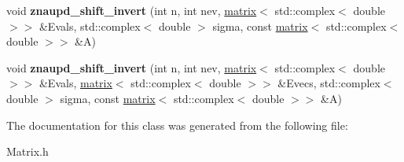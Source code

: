 \begin{DoxyCompactItemize}
\item 
\hypertarget{classkeycpp_1_1matrix_3_01_t_00_01dim_00_01_d_e_n_s_e___m_a_t_r_i_x_01_4_a30b43bbd651630fd1322b20ab9504ec8}{void {\bfseries znaupd\-\_\-shift\-\_\-invert} (int n, int nev, \hyperlink{classkeycpp_1_1matrix}{matrix}$<$ std\-::complex$<$ double $>$$>$ \&Evals, std\-::complex$<$ double $>$ sigma, const \hyperlink{classkeycpp_1_1matrix}{matrix}$<$ std\-::complex$<$ double $>$$>$ \&A)}\label{classkeycpp_1_1matrix_3_01_t_00_01dim_00_01_d_e_n_s_e___m_a_t_r_i_x_01_4_a30b43bbd651630fd1322b20ab9504ec8}

\item 
\hypertarget{classkeycpp_1_1matrix_3_01_t_00_01dim_00_01_d_e_n_s_e___m_a_t_r_i_x_01_4_a02b659cfe9bf61495ae3a2fa67881e92}{void {\bfseries znaupd\-\_\-shift\-\_\-invert} (int n, int nev, \hyperlink{classkeycpp_1_1matrix}{matrix}$<$ std\-::complex$<$ double $>$$>$ \&Evals, \hyperlink{classkeycpp_1_1matrix}{matrix}$<$ std\-::complex$<$ double $>$$>$ \&Evecs, std\-::complex$<$ double $>$ sigma, const \hyperlink{classkeycpp_1_1matrix}{matrix}$<$ std\-::complex$<$ double $>$$>$ \&A)}\label{classkeycpp_1_1matrix_3_01_t_00_01dim_00_01_d_e_n_s_e___m_a_t_r_i_x_01_4_a02b659cfe9bf61495ae3a2fa67881e92}

\end{DoxyCompactItemize}


The documentation for this class was generated from the following file\-:\begin{DoxyCompactItemize}
\item 
Matrix.\-h\end{DoxyCompactItemize}
